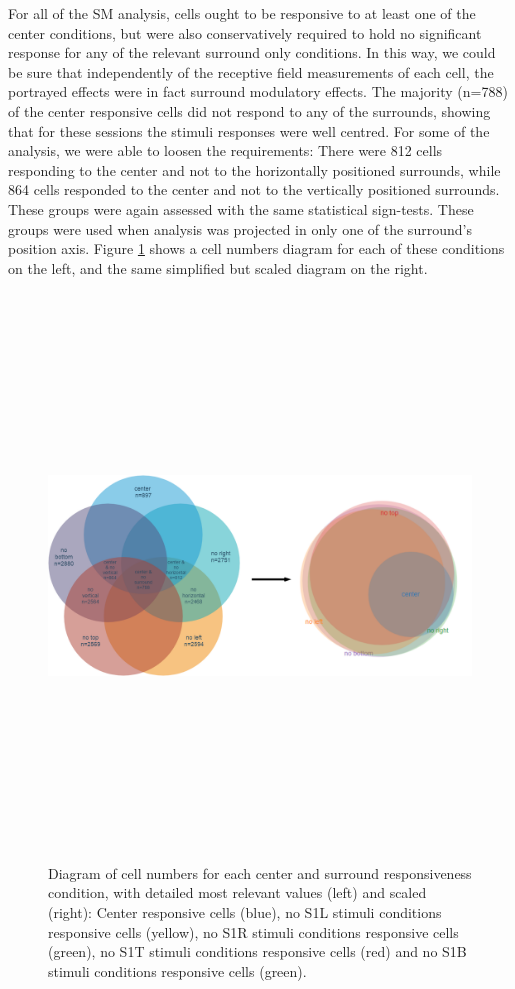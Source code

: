 For all of the SM analysis, cells ought to be responsive to at least one of the center conditions, but were also conservatively required to hold no significant response for any of the relevant surround only conditions. In this way, we could be sure that independently of the receptive field measurements of each cell, the portrayed effects were in fact surround modulatory effects.
The majority (n=788) of the center responsive cells did not respond to any of the surrounds, showing that for these sessions the stimuli responses were well centred. For some of the analysis, we were able to loosen the requirements: There were 812 cells responding to the center and not to the horizontally positioned surrounds, while 864 cells responded to the center and not to the vertically positioned surrounds. These groups were again assessed with the same statistical sign-tests. These groups were used when analysis was projected in only one of the surround's position axis. Figure \ref{groups3} shows a cell numbers diagram for each of these conditions on the left, and the same simplified but scaled diagram on the right.

\begin{figure}[H] \centering \includegraphics[width=15cm,height=15cm,keepaspectratio]{Figures/7.Results/data/SMdata.png} 
\caption{Diagram of cell numbers for each center and surround responsiveness condition, with detailed most relevant values (left) and scaled (right): Center responsive cells (blue), no S1L stimuli conditions responsive cells (yellow), no S1R stimuli conditions responsive cells (green), no S1T stimuli conditions responsive cells (red) and no S1B stimuli conditions responsive cells (green).}
\label{groups3}
\end{figure}

